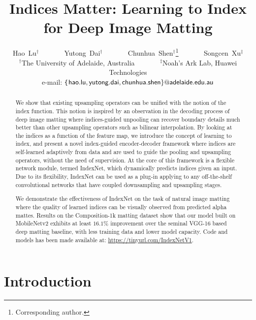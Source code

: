 \documentclass[10pt,twocolumn,letterpaper]{article}
\begin{document}
\title{
Indices Matter: Learning to Index for Deep Image Matting
}

\author{Hao~Lu$^\dagger$ ~ ~ ~ ~ Yutong~Dai$^\dagger$
~ ~ ~ ~
Chunhua~Shen$^\dagger$\thanks{Corresponding author.} ~ ~ ~ ~ Songcen~Xu$^\ddagger$\\
$^\dagger$The University of Adelaide, Australia ~ ~ ~ ~
$^\ddagger$Noah's Ark Lab, Huawei Technologies\\
e-mail: {\tt\small \{$\sf hao.lu,yutong.dai, chunhua.shen\}@adelaide.edu.au$}
}

\maketitle
\thispagestyle{empty}

\begin{abstract}

We show that existing upsampling operators can be unified with the notion of the index function. This notion is inspired by an observation in the decoding process of deep image matting where indices-guided unpooling can recover boundary details much better than other upsampling operators such as bilinear interpolation. By looking at the indices as a function of the feature map, we introduce the concept of learning to index, and present a novel index-guided encoder-decoder framework where indices are self-learned adaptively from data and are used to guide the pooling and upsampling operators, without the need of supervision. At the core of this framework is a flexible network module, termed IndexNet, which dynamically predicts indices given an input. Due to its flexibility, IndexNet can be used as a plug-in applying to any off-the-shelf convolutional networks that have coupled downsampling and upsampling stages.

	We demonstrate the effectiveness of IndexNet on the task of natural image matting where the quality of learned indices can be visually observed from predicted alpha mattes. Results on the Composition-1k matting dataset show that our model built on MobileNetv2 exhibits at least $16.1\%$ improvement over the seminal VGG-16 based deep matting baseline, with less training data and lower model capacity. Code and models has been made available at: {\small\url{https://tinyurl.com/IndexNetV1}}.


\end{abstract}



\section{Introduction}
\end{document}
